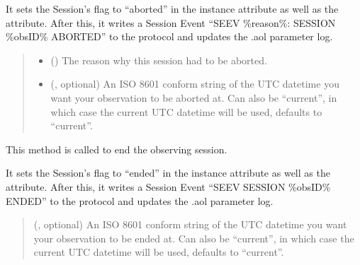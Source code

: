 \documentclass[letterpaper,10pt,english]{sphinxmanual}
\begin{document}
\begin{fulllineitems}
\begin{fulllineitems}
\sphinxAtStartPar
It sets the Session’s  flag to “aborted” in the instance
attribute as well as the  attribute. After this, it writes a
Session Event “SEEV \%reason\%: SESSION \%obsID\% ABORTED” to the protocol
and updates the .aol parameter log.
\begin{quote}\begin{description}
\begin{itemize}
\item {} 
\sphinxAtStartPar
{} () \textendash{} The reason why this session had to be aborted.

\item {} 
\sphinxAtStartPar
{} (, optional) \textendash{} An ISO 8601 conform string of the UTC datetime you want your
observation to be aborted at. Can also be “current”, in which case the
current UTC datetime will be used, defaults to “current”.

\end{itemize}

\end{description}\end{quote}

\end{fulllineitems}


\begin{fulllineitems}
\label{\detokenize{autoapi/aop/aop/index:aop.aop.Session.end}}
\pysigstartsignatures
{}
\pysigstopsignatures
\sphinxAtStartPar
This method is called to end the observing session.

\sphinxAtStartPar
It sets the Session’s  flag to “ended” in the instance
attribute as well as the  attribute. After this, it writes a
Session Event “SEEV SESSION \%obsID\% ENDED” to the protocol and updates
the .aol parameter log.
\begin{quote}\begin{description}
\sphinxAtStartPar
{} (, optional) \textendash{} An ISO 8601 conform string of the UTC datetime you want your
observation to be ended at. Can also be “current”, in which case the
current UTC datetime will be used, defaults to “current”.


\end{description}
\end{quote}
\end{fulllineitems}
\end{fulllineitems}
\end{document}
